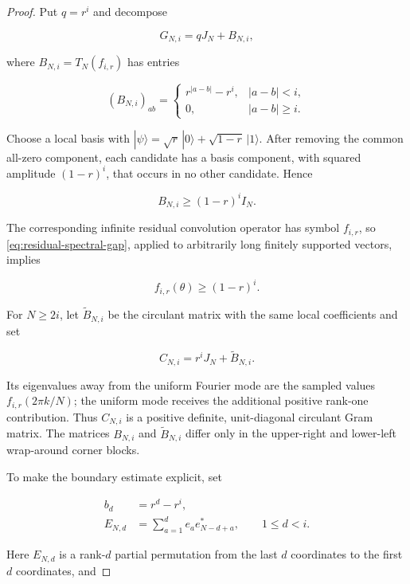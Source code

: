 \begin{proof}
Put \(q=r^i\) and decompose

\[
G_{N,i}=qJ_N+B_{N,i},
\]

where \(B_{N,i}=T_N(f_{i,r})\) has entries

\[
(B_{N,i})_{ab}=
\begin{cases}
r^{|a-b|}-r^i,&|a-b|<i,\\
0,&|a-b|\ge i.
\end{cases}
\]

Choose a local basis with \(|\psi\rangle=\sqrt r\,|0\rangle+\sqrt{1-r}\,|1\rangle\). After removing the common all-zero component, each candidate has a basis component, with squared amplitude \((1-r)^i\), that occurs in no other candidate. Hence

\begin{equation}\label{eq:residual-spectral-gap}
B_{N,i}\ge(1-r)^iI_N.
\end{equation}

The corresponding infinite residual convolution operator has symbol \(f_{i,r}\), so \eqref{eq:residual-spectral-gap}, applied to arbitrarily long finitely supported vectors, implies

\begin{equation}\label{eq:symbol-spectral-gap}
f_{i,r}(\theta)\ge(1-r)^i.
\end{equation}

For \(N\ge2i\), let \(\widetilde B_{N,i}\) be the circulant matrix with the same local coefficients and set

\[
C_{N,i}=r^iJ_N+\widetilde B_{N,i}.
\]

Its eigenvalues away from the uniform Fourier mode are the sampled values \(f_{i,r}(2\pi k/N)\); the uniform mode receives the additional positive rank-one contribution. Thus \(C_{N,i}\) is a positive definite, unit-diagonal circulant Gram matrix. The matrices \(B_{N,i}\) and \(\widetilde B_{N,i}\) differ only in the upper-right and lower-left wrap-around corner blocks.

To make the boundary estimate explicit, set

\begin{align*}
b_d&=r^d-r^i,\\
E_{N,d}&=\sum_{a=1}^{d}e_a e_{N-d+a}^*,
\qquad 1\le d<i.
\end{align*}

Here \(E_{N,d}\) is a rank-\(d\) partial permutation from the last \(d\)
coordinates to the first \(d\) coordinates, and


\end{proof}

